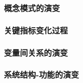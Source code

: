 \subsubsection*{概念模式的演变}

\subsubsection*{关键指标变化过程}

\subsubsection*{变量间关系的演变}

\subsubsection*{系统结构-功能的演变}
